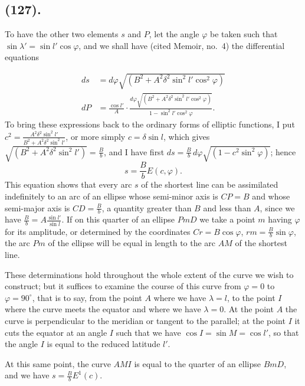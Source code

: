 \documentclass{article}
\begin{document}
\subsection*{(127).}

To have the other two elements $s$ and $P$, let the angle $\varphi$ be taken such that $\sin\lambda'=\sin l'\cos\varphi$, and we shall have (cited Memoir, no.~4) the differential equations

\[ \begin{aligned} ds&=d\varphi\sqrt{(B^{2}+A^{2}\delta^{2}\sin^{2}l'\cos^{2}\varphi)}\\ dP&=\frac{\cos l'}{A}\cdot\frac{d\varphi\sqrt{(B^{2}+A^{2}\delta^{2}\sin^{2}l'\cos^{2}\varphi)}}{1-\sin^{2}l'\cos^{2}\varphi}. \end{aligned} \]
To bring these expressions back to the ordinary forms of elliptic functions, I put $c^{2}=\frac{A^{2}\delta^{2}\sin^{2}l'}{B^{2}+A^{2}\delta^{2}\sin^{2}l'}$, or more simply $c=\delta\sin l$, which gives $\sqrt{(B^{2}+A^{2}\delta^{2}\sin^{2}l')}=\frac{B}{b}$, and I have first $ds=\frac{B}{b}\,d\varphi\sqrt{(1-c^{2}\sin^{2}\varphi)}$; hence
\[ s=\frac{B}{b}E(c,\varphi). \]
This equation shows that every arc $s$ of the shortest line can be assimilated indefinitely to an arc of an ellipse whose semi-minor axis is $CP=B$ and whose semi-major axis is $CD=\frac{B}{b}$, a quantity greater than $B$ and less than $A$, since we have $\frac{B}{b}=A\frac{\sin l'}{\sin l}$. If on this quarter of an ellipse $PmD$ we take a point $m$ having $\varphi$ for its amplitude, or determined by the coordinates $Cr=B\cos\varphi$, $rm=\frac{B}{b}\sin\varphi$, the arc $Pm$ of the ellipse will be equal in length to the arc $AM$ of the shortest line.

These determinations hold throughout the whole extent of the curve we wish to construct; but it suffices to examine the course of this curve from $\varphi=0$ to $\varphi=90^{\circ}$, that is to say, from the point $A$ where we have $\lambda=l$, to the point $I$ where the curve meets the equator and where we have $\lambda=0$. At the point $A$ the curve is perpendicular to the meridian or tangent to the parallel; at the point $I$ it cuts the equator at an angle $I$ such that we have $\cos I=\sin M=\cos l'$, so that the angle $I$ is equal to the reduced latitude $l'$.

At this same point, the curve $AMI$ is equal to the quarter of an ellipse $BmD$, and we have $s=\frac{B}{b}E^{1}(c)$.
\end{document}
